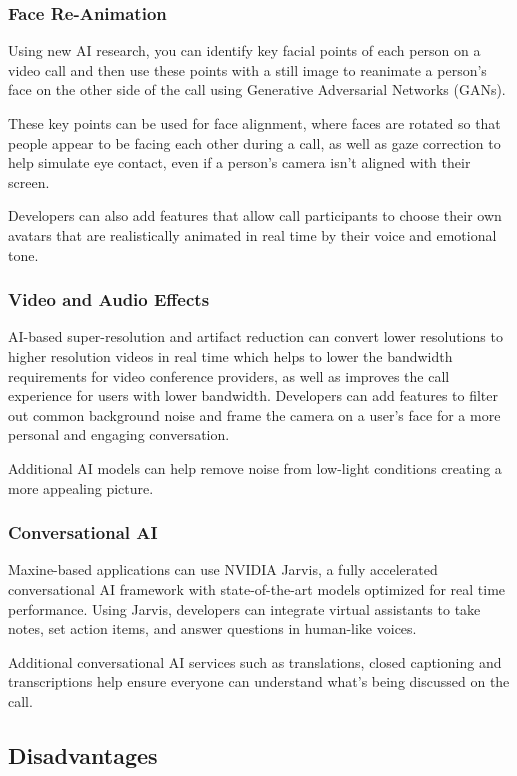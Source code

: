 \subsubsection{Face Re-Animation}
Using new AI research, you can identify key facial points of each person on a video call 
and then use these points with a still image to reanimate a person’s face on the other side 
of the call using Generative Adversarial Networks (GANs).

These key points can be used for face alignment, where faces are rotated so that
people appear to be facing each other during a call, as well as gaze correction 
to help simulate eye contact, even if a person’s camera isn’t aligned with their screen.

Developers can also add features that allow call participants to choose their
own avatars that are realistically animated in real time by their voice and emotional tone.

\subsubsection{Video and Audio Effects}
AI-based super-resolution and artifact reduction can convert lower resolutions to higher
resolution videos in real time which helps to lower the bandwidth requirements for video 
conference providers, as well as improves the call experience for users with lower bandwidth. 
Developers can add features to filter out common background noise and frame the camera on a user’s 
face for a more personal and engaging conversation.

Additional AI models can help remove noise from low-light conditions creating a more appealing picture.

\subsubsection{Conversational AI}
Maxine-based applications can use NVIDIA Jarvis, a fully accelerated conversational
AI framework with state-of-the-art models optimized for real time performance. Using Jarvis, 
developers can integrate virtual assistants to take notes, set action items, and answer questions 
in human-like voices.

Additional conversational AI services such as translations, closed captioning and transcriptions help 
ensure everyone can understand what’s being discussed on the call.

\subsection{Disadvantages}

